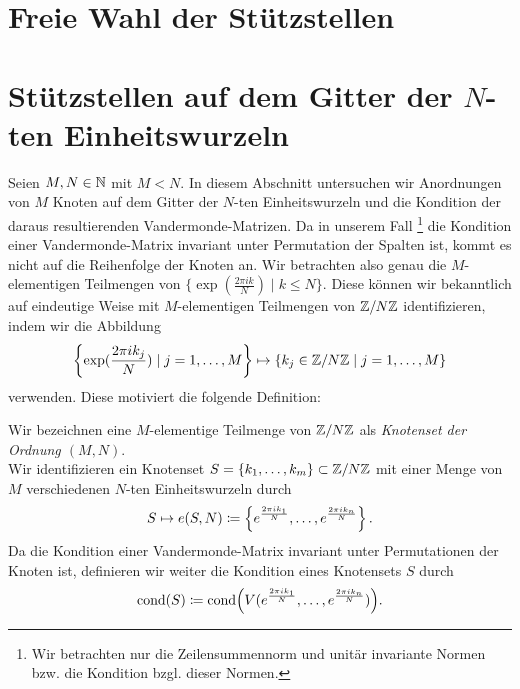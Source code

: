 \section{Freie Wahl der Stützstellen}
\section{Stützstellen auf dem Gitter der $N$-ten Einheitswurzeln}
Seien $M, N \in \mathbb{N}$ mit $M < N$.
In diesem Abschnitt untersuchen wir Anordnungen von $M$ Knoten auf dem Gitter
der $N$-ten Einheitswurzeln und die Kondition der daraus resultierenden
Vandermonde-Matrizen.
Da in unserem Fall
\footnote{Wir betrachten nur die Zeilensummennorm und unitär invariante Normen bzw. die Kondition bzgl. dieser Normen.}
die Kondition einer Vandermonde-Matrix invariant unter
Permutation der Spalten ist, kommt es nicht auf die Reihenfolge der Knoten an.
Wir betrachten also genau die $M$-elementigen Teilmengen von
$\{ \exp( \frac{2 \pi i k}{N} ) \; | \; k \leq N \}$.
Diese können wir bekanntlich auf eindeutige Weise mit $M$-elementigen
Teilmengen von $ \mathbb{Z} / N\mathbb{Z}$ identifizieren, indem wir die Abbildung
\[
    \left\{ \exp( \frac{2 \pi i k_j}{N} ) \; | \; j = 1,\dots, M \right\} \mapsto \left\{ k_j \in \mathbb{Z}/N\mathbb{Z} \; | \; j = 1, \dots, M \right\}
\]
verwenden.
Diese motiviert die folgende Definition:

\begin{mydef}[Knotenset]
    Wir bezeichnen eine $M$-elementige Teilmenge von $\mathbb{Z}/N\mathbb{Z}$
    als \emph{Knotenset der Ordnung $(M,N)$}.\\
    Wir identifizieren ein Knotenset
    $S = \{k_1, \dots, k_m\} \subset \mathbb{Z}/N\mathbb{Z}$
    mit einer Menge von $M$ verschiedenen $N$-ten Einheitswurzeln durch
    \[
        S \mapsto e(S, N) \coloneqq \left\{ e^{\frac{2 \pi i k_1}{N}}, \dots, e^{\frac{2 \pi i k_n}{N}} \right\}.
    \]
    Da die Kondition einer Vandermonde-Matrix invariant unter Permutationen der
    Knoten ist, definieren wir weiter die Kondition eines Knotensets $S$ durch
    \[
        \text{cond$ \left( S \right)$} \coloneqq \text{cond$ \left( \text{$V( e^{\frac{2 \pi i k_1}{N}}, \dots, e^{\frac{2 \pi i k_n}{N}} )$} \right)$}.
    \]
\end{mydef}
